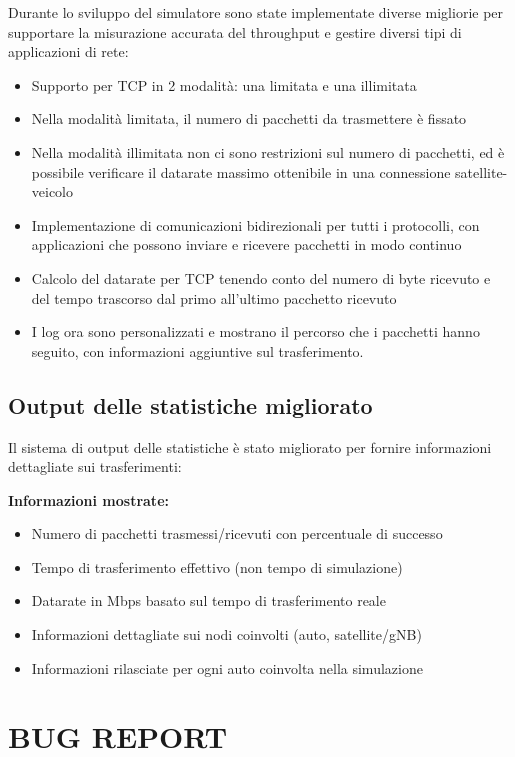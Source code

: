 \documentclass[12pt,a4paper]{article}
\begin{document}
Durante lo sviluppo del simulatore sono state implementate diverse migliorie per supportare la misurazione accurata del throughput e gestire diversi tipi di applicazioni di rete:

\begin{itemize}
\item
  Supporto per TCP in 2 modalità: una limitata e una illimitata
\item
  Nella modalità limitata, il numero di pacchetti da trasmettere è fissato
\item
  Nella modalità illimitata non ci sono restrizioni sul numero di pacchetti, ed è possibile verificare il datarate massimo ottenibile in una connessione satellite-veicolo
\item
  Implementazione di comunicazioni bidirezionali per tutti i protocolli, con applicazioni che possono inviare e ricevere pacchetti in modo continuo
\item
  Calcolo del datarate per TCP tenendo conto del numero di byte ricevuto e del tempo trascorso dal primo all'ultimo pacchetto ricevuto
\item
  I log ora sono personalizzati e mostrano il percorso che i pacchetti hanno seguito, con informazioni aggiuntive sul trasferimento.
\end{itemize}

\subsection{Output delle statistiche migliorato}

Il sistema di output delle statistiche è stato migliorato per fornire informazioni dettagliate sui trasferimenti:

\textbf{Informazioni mostrate:}
\begin{itemize}
    \item Numero di pacchetti trasmessi/ricevuti con percentuale di successo
    \item Tempo di trasferimento effettivo (non tempo di simulazione)
    \item Datarate in Mbps basato sul tempo di trasferimento reale
    \item Informazioni dettagliate sui nodi coinvolti (auto, satellite/gNB)
    \item Informazioni rilasciate per ogni auto coinvolta nella simulazione
\end{itemize}

\section{BUG REPORT}
\end{document}
